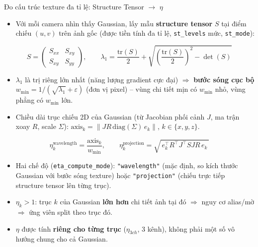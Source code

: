 
\begin{frame}{Đo cấu trúc texture đa tỉ lệ: Structure Tensor $\to$ $\eta$}
\footnotesize
\begin{itemize}
    \item Với mỗi camera nhìn thấy Gaussian, lấy mẫu \textbf{structure tensor} $S$ tại điểm chiếu $(u,v)$ trên ảnh gốc (được tiền tính đa tỉ lệ, \texttt{st\_levels} mức, \texttt{st\_mode}):
\end{itemize}
\[
S = \begin{pmatrix} S_{xx} & S_{xy} \\ S_{xy} & S_{yy}\end{pmatrix}, \qquad
\lambda_1 = \frac{\text{tr}(S)}{2} + \sqrt{\left(\frac{\text{tr}(S)}{2}\right)^2 - \det(S)}
\]
\begin{itemize}
    \item $\lambda_1$ là trị riêng lớn nhất (năng lượng gradient cực đại) $\Rightarrow$ \textbf{bước sóng cục bộ} $w_{\min} = 1/(\sqrt{\lambda_1}+\varepsilon)$ (đơn vị pixel) -- vùng chi tiết mịn có $w_{\min}$ nhỏ, vùng phẳng có $w_{\min}$ lớn.
    \item Chiều dài trục chiếu 2D của Gaussian (từ Jacobian phối cảnh $J$, ma trận xoay $R$, scale $\Sigma$): $\text{axis}_k = \lVert J R \,\text{diag}(\Sigma)\, e_k\rVert$, $k\in\{x,y,z\}$.
\end{itemize}
\[
\eta_k^{\text{wavelength}} = \frac{\text{axis}_k}{w_{\min}}, \qquad
\eta_k^{\text{projection}} = \sqrt{\,e_k^\top R^\top J^\top S J R\, e_k\,}
\]
\begin{itemize}
    \item Hai chế độ (\texttt{eta\_compute\_mode}): \texttt{"wavelength"} (mặc định, so kích thước Gaussian với bước sóng texture) hoặc \texttt{"projection"} (chiếu trực tiếp structure tensor lên từng trục).
    \item $\eta_k > 1$: trục $k$ của Gaussian \textbf{lớn hơn} chi tiết ảnh tại đó $\Rightarrow$ nguy cơ alias/mờ $\Rightarrow$ ứng viên split theo trục đó.
    \item $\eta$ được tính \textbf{riêng cho từng trục} ($\eta_{3ch}$, 3 kênh), không phải một số vô hướng chung cho cả Gaussian.
\end{itemize}
\end{frame}

